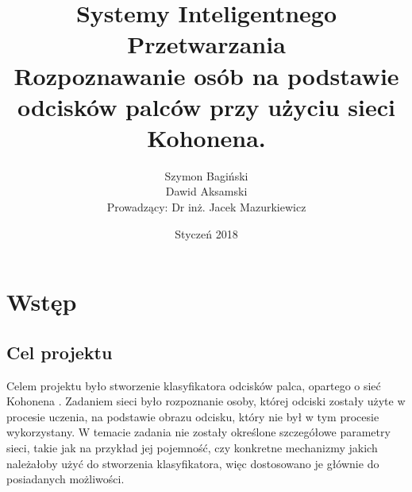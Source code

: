 \documentclass[12pt, notitlepage]{article}
\begin{document}
\begin{titlepage}
    \thispagestyle{empty}
    \title{\textbf{
        \Huge Systemy Inteligentnego Przetwarzania \\
        [1cm]
        \LARGE Rozpoznawanie osób na podstawie odcisków palców przy użyciu sieci Kohonena. 
    }}
    \author{
        Szymon Bagiński \\ 
        Dawid Aksamski \\
        [1cm]
        {\small Prowadzący: Dr inż. Jacek Mazurkiewicz}
    }
    \date{Styczeń 2018}
    \maketitle
    \vfill
    \vfill
\end{titlepage}    


\tableofcontents

\newpage
\section{Wstęp}

\subsection{Cel projektu}

Celem projektu było stworzenie klasyfikatora odcisków palca, opartego o sieć Kohonena \cite{Kohonen}. Zadaniem sieci było rozpoznanie osoby, której odciski zostały użyte w procesie uczenia, na podstawie obrazu odcisku, który nie był w tym procesie wykorzystany. W temacie zadania nie zostały określone szczegółowe parametry sieci, takie jak na przykład jej pojemność, czy konkretne mechanizmy jakich należałoby użyć do stworzenia klasyfikatora, więc dostosowano je głównie do posiadanych możliwości.
\end{document}
